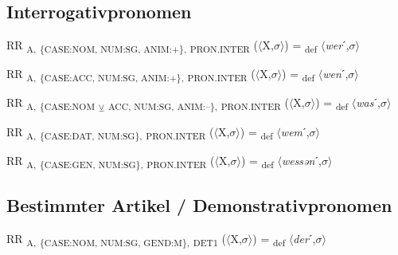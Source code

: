 {\subsection{Interrogativpronomen}

\begin{exe}
 RR \textsubscript{A,} \textsubscript{\{CASE:NOM, NUM:SG, ANIM:+\},} \textsubscript{PRON.INTER} ($\langle$X,$\sigma $$\rangle$) = \textsubscript{def} $\langle$\textit{wer}ˊ,$\sigma $$\rangle$
\end{exe}

\begin{exe}
 RR \textsubscript{A,} \textsubscript{\{CASE:ACC, NUM:SG, ANIM:+\},} \textsubscript{PRON.INTER} ($\langle$X,$\sigma $$\rangle$) = \textsubscript{def} $\langle$\textit{wen}ˊ,$\sigma $$\rangle$
\end{exe}

\begin{exe}
 RR \textsubscript{A,} \textsubscript{\{CASE:NOM} \textsubscript{${\veebar}$}\textsubscript{ ACC, NUM:SG, ANIM:–\},} \textsubscript{PRON.INTER} ($\langle$X,$\sigma $$\rangle$) = \textsubscript{def} $\langle$\textit{was}ˊ,$\sigma $$\rangle$
\end{exe}

\begin{exe}
 RR \textsubscript{A,} \textsubscript{\{CASE:DAT, NUM:SG\},} \textsubscript{PRON.INTER} ($\langle$X,$\sigma $$\rangle$) = \textsubscript{def} $\langle$\textit{wem}ˊ,$\sigma $$\rangle$
\end{exe}

\begin{exe}
 RR \textsubscript{A,} \textsubscript{\{CASE:GEN, NUM:SG\},} \textsubscript{PRON.INTER} ($\langle$X,$\sigma $$\rangle$) = \textsubscript{def} $\langle$\textit{wessən}ˊ,$\sigma $$\rangle$
\end{exe}

\subsection{Bestimmter Artikel / Demonstrativpronomen}

\begin{exe}
 RR \textsubscript{A,} \textsubscript{\{CASE:NOM, NUM:SG, GEND:M\},} \textsubscript{DET1} ($\langle$X,$\sigma $$\rangle$) = \textsubscript{def} $\langle$\textit{der}ˊ,$\sigma $$\rangle$
\end{exe}

}

